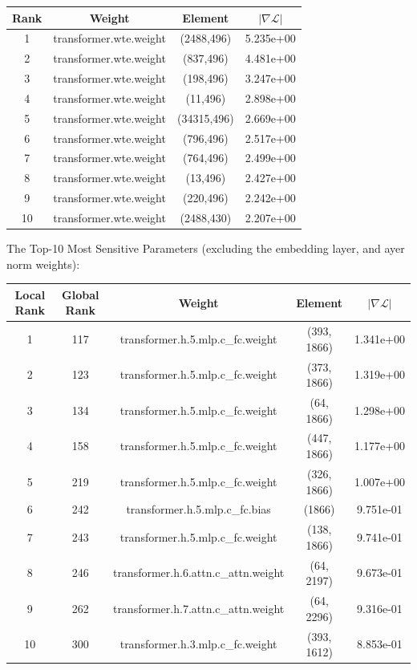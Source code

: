 \documentclass[12pt]{article}
\begin{document}
\begin{table}[H]
\centering
\begin{tabular}{|c|c|c|c|}
\hline
Rank & Weight & Element & $|\nabla \mathcal{L}|$ \\
\hline
1 & transformer.wte.weight & (2488,496)  & 5.235e+00 \\
2 & transformer.wte.weight & (837,496)   & 4.481e+00 \\
3 & transformer.wte.weight & (198,496)   & 3.247e+00 \\
4 & transformer.wte.weight & (11,496)    & 2.898e+00 \\
5 & transformer.wte.weight & (34315,496) & 2.669e+00 \\
6 & transformer.wte.weight & (796,496)   & 2.517e+00 \\
7 & transformer.wte.weight & (764,496)   & 2.499e+00 \\
8 & transformer.wte.weight & (13,496)    & 2.427e+00 \\
9 & transformer.wte.weight & (220,496)   & 2.242e+00 \\
10 & transformer.wte.weight & (2488,430) & 2.207e+00 \\
\hline
\end{tabular}
\end{table}

The Top-10 Most Sensitive Parameters (excluding the embedding layer, and ayer norm weights):

\begin{table}[H]
\centering
\begin{tabular}{|c|c|c|c|c|}
\hline
Local Rank & Global Rank & Weight & Element & $|\nabla \mathcal{L}|$ \\
\hline
1 & 117 & transformer.h.5.mlp.c\_fc.weight & (393, 1866) & 1.341e+00 \\
2 & 123 & transformer.h.5.mlp.c\_fc.weight & (373, 1866) & 1.319e+00 \\
3 & 134 & transformer.h.5.mlp.c\_fc.weight & (64, 1866)  & 1.298e+00 \\
4 & 158 & transformer.h.5.mlp.c\_fc.weight & (447, 1866) & 1.177e+00 \\
5 & 219 & transformer.h.5.mlp.c\_fc.weight & (326, 1866) & 1.007e+00 \\
6 & 242 & transformer.h.5.mlp.c\_fc.bias   & (1866)      & 9.751e-01 \\
7 & 243 & transformer.h.5.mlp.c\_fc.weight & (138, 1866) & 9.741e-01 \\
8 & 246 & transformer.h.6.attn.c\_attn.weight & (64, 2197)  & 9.673e-01 \\
9 & 262 & transformer.h.7.attn.c\_attn.weight & (64, 2296)  & 9.316e-01 \\
10 & 300 & transformer.h.3.mlp.c\_fc.weight & (393, 1612) & 8.853e-01 \\
\hline
\end{tabular}
\end{table}
\end{document}
